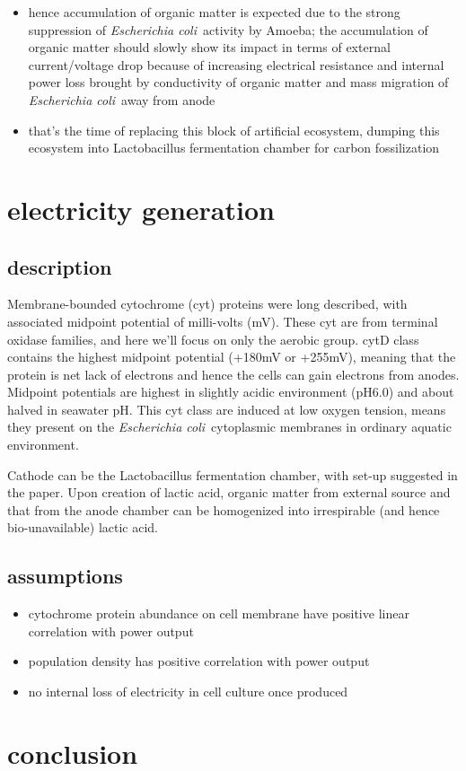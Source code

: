 \documentclass[a4paper,11pt]{article}
\newcommand{\ec}{\textit{Escherichia coli}}
\newcommand{\am}{Amoeba}
\begin{document}
\begin{enumerate}
\begin{itemize}
            \item hence accumulation of organic matter is expected due to the strong suppression of \ec\ activity by \am; the accumulation of organic matter should slowly show its impact in terms of external current/voltage drop because of increasing electrical resistance and internal power loss brought by conductivity of organic matter and mass migration of \ec\ away from anode
            \item that's the time of replacing this block of artificial ecosystem, dumping this ecosystem into Lactobacillus fermentation chamber for carbon fossilization
        \end{itemize}
    \end{enumerate}
    
    \section{electricity generation}
    \subsection{description}
        Membrane-bounded cytochrome (cyt) proteins were long described\autocite{gennis1987cytochromes,edwards2000escherichia}, with associated midpoint potential of milli-volts (mV).  These cyt are from terminal oxidase families, and here we'll focus on only the aerobic group.  cytD class contains the highest midpoint potential (+180mV\autocite{gennis1987cytochromes} or +255mV\autocite{lorence1984effects}), meaning that the protein is net lack of electrons and hence the cells can gain electrons from anodes.  Midpoint potentials are highest in slightly acidic environment (pH6.0) and about halved in seawater pH\autocite{lorence1984effects}.  This cyt class are induced at low oxygen tension\autocite{gennis1987cytochromes}, means they present on the \ec\ cytoplasmic membranes in ordinary aquatic environment.
        
        Cathode can be the Lactobacillus fermentation chamber\autocite{min2005electricity}, with set-up suggested in the paper.  Upon creation of lactic acid, organic matter from external source and that from the anode chamber can be homogenized into irrespirable (and hence bio-unavailable) lactic acid.
    \subsection{assumptions}
    \begin{itemize}
        \item cytochrome protein abundance on cell membrane have positive linear correlation with power output
        \item population density has positive correlation with power output
        \item no internal loss of electricity in cell culture once produced
    \end{itemize}
    
    \section{conclusion}
    
    \nocite{*}\printbibliography
\end{document}
